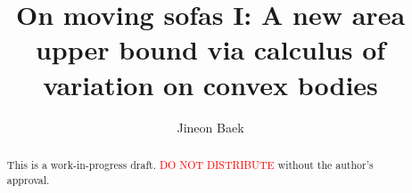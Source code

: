 \documentclass[10pt]{article}
\title{On moving sofas I: A new area upper bound via calculus of variation on convex bodies}
\author{Jineon Baek}
\theoremstyle{plain}
\theoremstyle{definition}
\theoremstyle{remark}
\begin{document}
\maketitle
\tableofcontents

\begin{abstract}
This is a work-in-progress draft. \textcolor{red}{DO NOT DISTRIBUTE} without the author's approval.
\end{abstract}



\printbibliography
\end{document}
